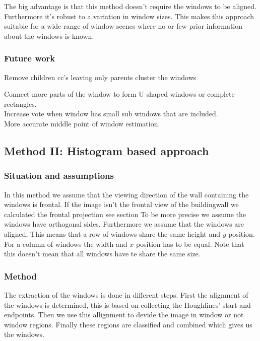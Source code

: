 The big advantage is that this method doesn't require the windows to be aligned.
Furthermore it's robust to a variation in window sizes. This makes this approach suitable
for a wide range of window scenes where no or few prior information about the
	windows is known.


\subsubsection{Future work}
Remove children cc's leaving only parents
cluster the windows

Connect more parts of the window to form U shaped windows or complete rectangles.\\
Increase vote when window has small sub windows that are included.\\
More accurate middle point of window estimation. 


\subsection{Method II: Histogram based approach} 
\subsubsection{Situation and assumptions}
In this method we assume that the viewing direction of the wall containing the windows is frontal.
If the image isn't the frontal view of the buildingwall we calculated the frontal projection
see section %
To be more precise we assume the windows have orthogonal sides.  Furthermore we
assume that the windows are aligned, This means that a row of windows share the
same height and $y$ position. For a column of windows the width and $x$
position has to be equal.  Note that this doesn't mean that all windows have te
share the same size.

\subsubsection{Method}
The extraction of the windows is done in different steps. 
First the alignment of the windows is determined, this is based on collecting
the Houghlines' start and endpoints. Then we use this allignment to devide the
image in window or not window regions.  Finally these regions are classified
and combined which gives us the windows.


